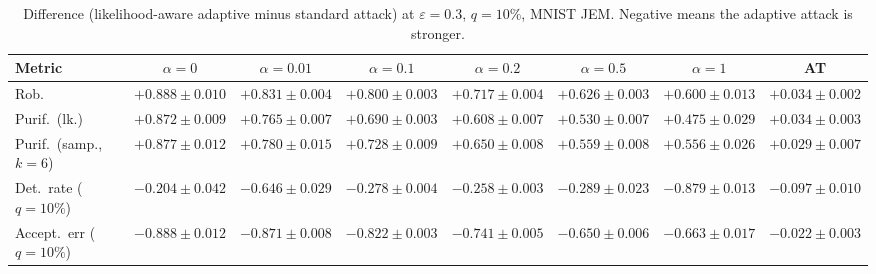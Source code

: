 \begin{table}[htbp]
  \centering
  \begin{tabular}{lccccccc}
    \toprule
    Metric & $\alpha{=}0$ & $\alpha{=}0.01$ & $\alpha{=}0.1$ & $\alpha{=}0.2$ & $\alpha{=}0.5$ & $\alpha{=}1$ & AT \\
    \midrule
    Rob. & $+0.888 \pm 0.010$ & $+0.831 \pm 0.004$ & $+0.800 \pm 0.003$ & $+0.717 \pm 0.004$ & $+0.626 \pm 0.003$ & $+0.600 \pm 0.013$ & $+0.034 \pm 0.002$ \\
    Purif.\ (lk.) & $+0.872 \pm 0.009$ & $+0.765 \pm 0.007$ & $+0.690 \pm 0.003$ & $+0.608 \pm 0.007$ & $+0.530 \pm 0.007$ & $+0.475 \pm 0.029$ & $+0.034 \pm 0.003$ \\
    Purif.\ (samp., $k{=}6$) & $+0.877 \pm 0.012$ & $+0.780 \pm 0.015$ & $+0.728 \pm 0.009$ & $+0.650 \pm 0.008$ & $+0.559 \pm 0.008$ & $+0.556 \pm 0.026$ & $+0.029 \pm 0.007$ \\
    Det.\ rate ($q{=}10\%$) & $-0.204 \pm 0.042$ & $-0.646 \pm 0.029$ & $-0.278 \pm 0.004$ & $-0.258 \pm 0.003$ & $-0.289 \pm 0.023$ & $-0.879 \pm 0.013$ & $-0.097 \pm 0.010$ \\
    Accept.\ err ($q{=}10\%$) & $-0.888 \pm 0.012$ & $-0.871 \pm 0.008$ & $-0.822 \pm 0.003$ & $-0.741 \pm 0.005$ & $-0.650 \pm 0.006$ & $-0.663 \pm 0.017$ & $-0.022 \pm 0.003$ \\
    \bottomrule
  \end{tabular}
  \caption{Difference (likelihood-aware adaptive minus standard attack) at $\varepsilon=0.3$, $q=10\%$, MNIST JEM. Negative means the adaptive attack is stronger.}
  \label{tab:joint_vs_normal_jem_eps0.3}
\end{table}
